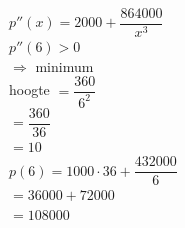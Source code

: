 \documentclass[a4paper]{article}
\begin{document}
$p''(x)=2000+\dfrac{864000}{x^3}$ \\

$p''(6)>0$ \\

$\Rightarrow$ minimum \\

hoogte $=\dfrac{360}{6^2}$ \\

$=\dfrac{360}{36}$ \\

$=10$ \\

$p(6)=1000\cdot36+\dfrac{432000}{6}$ \\

$=36000+72000$ \\

$=108000$ \\

 \\

\end{document}
